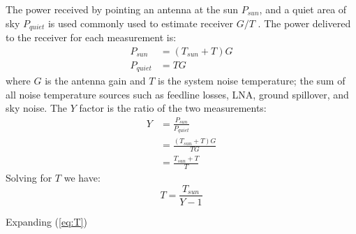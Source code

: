 \documentclass{article}
\begin{document}
The power received by pointing an antenna at the sun $P_{sun}$, and a quiet area of sky $P_{quiet}$ is used commonly used to estimate receiver $G/T$ \cite{flagg2006_det_gt}.  The power delivered to the receiver for each measurement is:
\begin{equation}
\begin{split}
P_{sun} &= (T_{sun}+T)G \\
P_{quiet} &= TG 
\end{split}
\end{equation}
where $G$ is the antenna gain and $T$ is the system noise temperature; the sum of all noise temperature sources such as feedline losses, LNA, ground spillover, and sky noise. The $Y$ factor is the ratio of the two  measurements:
\begin{equation}
\begin{split}
Y &= \frac{P_{sun}}{P_{quiet}} \\
  &= \frac{(T_{sun}+T)G}{TG} \\
  &= \frac{T_{sun}+T}{T} 
\end{split}
\end{equation}
Solving for $T$ we have:
\begin{equation} \label{eq:T}
T = \frac{T_{sun}}{Y-1}
\end{equation}

Expanding (\ref{eq:T})



\end{document}
